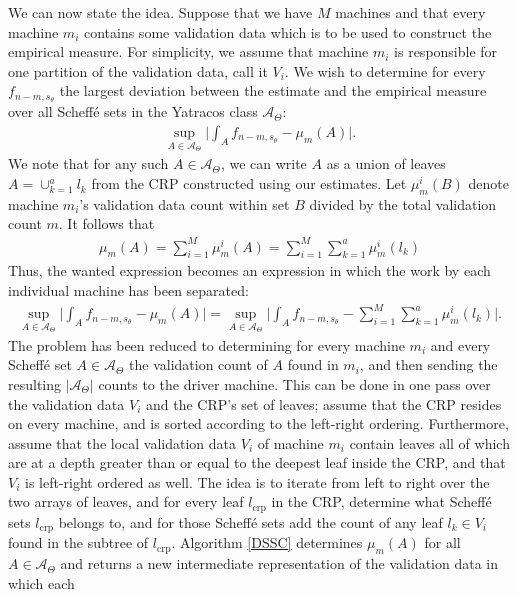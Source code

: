\documentclass{report}
\begin{document}
We can now state the idea. Suppose that we have $M$ machines and that every machine $m_i$ contains some validation data which is to be used to construct the empirical measure.
For simplicity, we assume that machine $m_i$ is responsible for one partition of the validation data, call it $V_i$. We wish to determine for every $f_{n-m,s_\theta}$ the largest deviation between the estimate and the empirical measure
over all Scheffé sets in the Yatracos class $\mathcal{A}_\Theta$:
\begin{align*}
	 \sup_{A \in \mathcal{A}_\Theta} \bigg| \int_A f_{n-m,s_\theta} - \mu_m(A) \bigg|.
\end{align*}
We note that for any such $A\in \mathcal{A}_\Theta$, we can write $A$ as a union of leaves  $A = \cup_{k=1}^a l_k$ from the CRP constructed using our estimates.
Let $\mu_m^i(B)$ denote machine $m_i$'s validation data count within set $B$ divided by the total validation count $m$. It follows that 
\begin{align*}
	\mu_m(A) = \sum_{i=1}^M \mu_m^i(A) = \sum_{i=1}^M \sum_{k=1}^a \mu_m^i(l_k)
\end{align*}
Thus, the wanted expression becomes an expression in which the work by each individual machine has been separated:
\begin{align*}
	 \sup_{A \in \mathcal{A}_\Theta} \bigg| \int_A f_{n-m,s_\theta} - \mu_m(A) \bigg| = \sup_{A \in \mathcal{A}_\Theta} \bigg| \int_A f_{n-m,s_\theta} - \sum_{i=1}^M \sum_{k=1}^a \mu_m^i(l_k) \bigg|. 
\end{align*}
The problem has been reduced to determining for every machine $m_i$ and every Scheffé set $A \in \mathcal{A}_\Theta$ the validation count of $A$ found in $m_i$, and then sending the resulting $|\mathcal{A}_\Theta|$ counts
to the driver machine. This can be done in one pass over the validation data $V_i$ and the CRP's set of leaves;  assume that the CRP resides on every machine, and is sorted according to the left-right ordering.
Furthermore, assume that the local validation data $V_i$ of machine $m_i$ contain leaves all of which are at a depth greater than or equal to the deepest leaf inside the CRP, and that $V_i$ is left-right ordered as well. 
The idea is to iterate from left to right over the two arrays of leaves, and for every leaf $l_{\text{crp}}$ in the CRP, determine what Scheffé sets $l_{\text{crp}}$ belongs to, and for those Scheffé sets add the count of any 
leaf $l_k \in V_i$ found in the subtree of $l_{\text{crp}}$. Algorithm \ref{DSSC} determines $\mu_m(A)$ for all $A \in \mathcal{A}_\Theta$ and returns a new intermediate representation of the validation data in which each 
\end{document}
